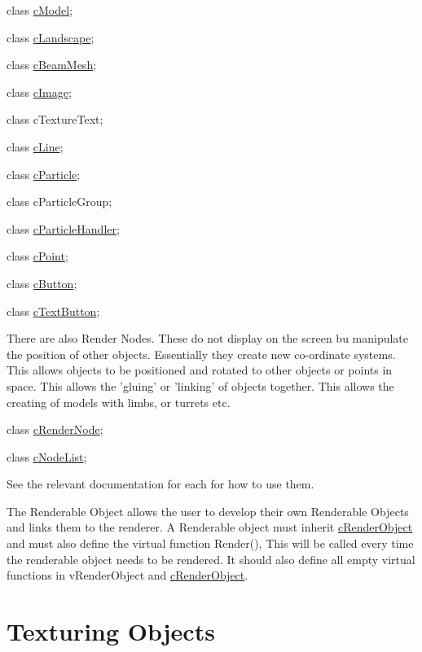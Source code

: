 class \hyperlink{classc_model}{cModel}; \par
 class \hyperlink{classc_landscape}{cLandscape}; \par
 class \hyperlink{classc_beam_mesh}{cBeamMesh}; \par
 class \hyperlink{classc_image}{cImage}; \par
 class cTextureText; \par
 class \hyperlink{classc_line}{cLine}; \par
 class \hyperlink{classc_particle}{cParticle}; \par
 class cParticleGroup; \par
 class \hyperlink{classc_particle_handler}{cParticleHandler}; \par
 class \hyperlink{classc_point}{cPoint}; \par
 class \hyperlink{classc_button}{cButton}; \par
 class \hyperlink{classc_text_button}{cTextButton}; \par
 \par
 There are also Render Nodes. These do not display on the screen bu manipulate the position of other objects. Essentially they create new co-\/ordinate systems. This allows objects to be positioned and rotated to other objects or points in space. This allows the 'gluing' or 'linking' of objects together. This allows the creating of models with limbs, or turrets etc. \par
 class \hyperlink{classc_render_node}{cRenderNode}; \par
 class \hyperlink{classc_node_list}{cNodeList}; \par
 \par
 See the relevant documentation for each for how to use them. \par
 \par
 The Renderable Object allows the user to develop their own Renderable Objects and links them to the renderer. A Renderable object must inherit \hyperlink{classc_render_object}{cRenderObject} and must also define the virtual function Render(), This will be called every time the renderable object needs to be rendered. It should also define all empty virtual functions in vRenderObject and \hyperlink{classc_render_object}{cRenderObject}.\hypertarget{_using_engine_page_MultiTexturing}{}\section{Texturing Objects}\label{_using_engine_page_MultiTexturing}
